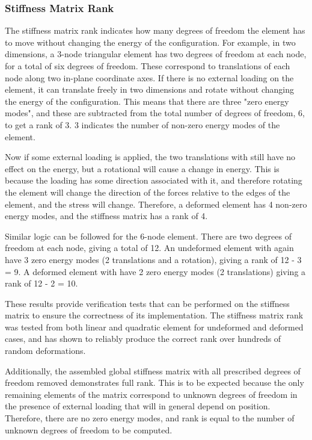 \documentclass[]{spie}  %
\begin{document}
\subsubsection{Stiffness Matrix Rank}
The stiffness matrix rank indicates how many degrees of freedom the element has to move without changing the energy of the configuration. For example, in two dimensions, a 3-node triangular element has two degrees of freedom at each node, for a total of six degrees of freedom. These correspond to translations of each node along two in-plane coordinate axes. If there is no external loading on the element, it can translate freely in two dimensions and rotate without changing the energy of the configuration. This means that there are three "zero energy modes", and these are subtracted from the total number of degrees of freedom, 6, to get a rank of 3. 3 indicates the number of non-zero energy modes of the element. 

Now if some external loading is applied, the two translations with still have no effect on the energy, but a rotational will cause a change in energy. This is because the loading has some direction associated with it, and therefore rotating the element will change the direction of the forces relative to the edges of the element, and the stress will change. Therefore, a deformed element has 4 non-zero energy modes, and the stiffness matrix has a rank of 4. 

Similar logic can be followed for the 6-node element. There are two degrees of freedom at each node, giving a total of 12. An undeformed element with again have 3 zero energy modes (2 translations and a rotation), giving a rank of 12 - 3 = 9. A deformed element with have 2 zero energy modes (2 translations) giving a rank of 12 - 2 = 10.

These results provide verification tests that can be performed on the stiffness matrix to ensure the correctness of its implementation. The stiffness matrix rank was tested from both linear and quadratic element for undeformed and deformed cases, and has shown to reliably produce the correct rank over hundreds of random deformations. 

Additionally, the assembled global stiffness matrix with all prescribed degrees of freedom removed demonstrates full rank. This is to be expected because the only remaining elements of the matrix correspond to unknown degrees of freedom in the presence of external loading that will in general depend on position. Therefore, there are no zero energy modes, and rank is equal to the number of unknown degrees of freedom to be computed. 
\end{document}
